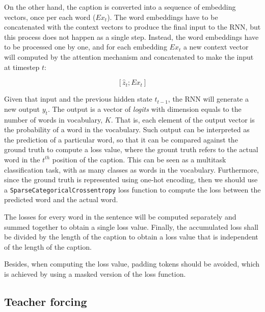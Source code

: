 On the other hand, the caption is converted into a sequence of embedding vectors, once per each word ($Ex_t$).  The word embeddings have to be concatenated with the context vectors to produce the final input to the RNN, but this process does not happen as a single step. Instead, the word embeddings have to be processed one by one, and for each embedding $Ex_t$  a new context vector will computed by the attention mechanism and concatenated to make the input at timestep $t$:

$$[\hat{z}_t;Ex_t]$$

Given that input and the previous hidden state $t_{t-1}$, the RNN will generate a new output $y_t$. The output is a vector of \textit{logits} with dimension equals to the number of words in vocabulary, $K$. That is, each element of the output vector is the probability of a word in the vocabulary. Such output can be interpreted as the prediction of a particular word, so that it can be compared against the ground truth to compute a loss value, where the grount truth refers to the actual word in the $t^{th}$ position of the caption. This can be seen as a multitask classification task, with as many classes as words in the vocabulary. Furthermore, since the ground truth is represented using one-hot encoding, then we should use  a \lstinline{SparseCategoricalCrossentropy} loss function to compute the loss between the predicted word and the actual word.

The losses for every word in the sentence will be computed separately and summed together to obtain a single loss value. Finally, the accumulated loss shall be divided by the length of the caption to obtain a loss value that is independent of the length of the caption.

Besides, when computing the loss value, padding tokens should be avoided, which is achieved by using a masked version of the loss function. 


\subsection{Teacher forcing}\label{subsec:teacher_forcing}

